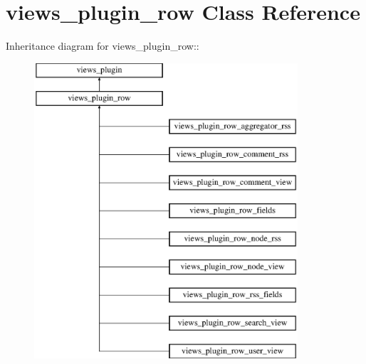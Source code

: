 \hypertarget{classviews__plugin__row}{
\section{views\_\-plugin\_\-row Class Reference}
\label{classviews__plugin__row}
}
Inheritance diagram for views\_\-plugin\_\-row::\begin{figure}[H]
\begin{center}
\leavevmode
\includegraphics[height=11cm]{classviews__plugin__row}
\end{center}
\end{figure}

